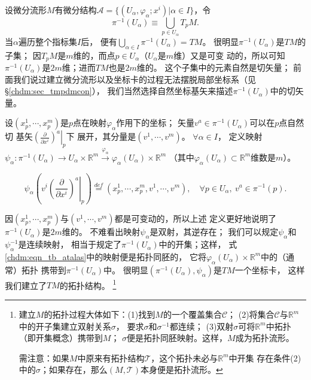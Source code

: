 设微分流形$M$有微分结构$\mathscr{A}=\{(U_\alpha,\varphi_\alpha;x^i)|\alpha \in I \}$，令
\begin{equation}
    \pi^{-1} (U_\alpha) \equiv \bigcup _{p\in U_\alpha} T_pM .
\end{equation}
当$\alpha$遍历整个指标集$I$后，
便有$\bigcup _{\alpha \in I}  \pi^{-1} (U_\alpha) = TM$。
很明显$\pi^{-1} (U_\alpha)$是$TM$的子集；
因$T_pM$是$m$维的，而点$p\in U_\alpha$（$U_\alpha$是$m$维）又是可变
动的，所以可知$\pi^{-1} (U_\alpha)$是$2m$维；进而$TM$也是$2m$维的。
这个子集中的元素自然是切矢量；
前面我们说过建立微分流形以及坐标卡的过程无法摆脱局部坐标系（见\S \ref{chdm:sec_tmpdmcon}），
我们当然选择自然坐标基矢来描述$\pi^{-1} (U_\alpha)$中的切矢量。


设$(x_p^1,\cdots,x_p^m)$是$p$点在映射$\varphi_\alpha$作用下的坐标；
矢量$v^a\in \pi^{-1} (U_\alpha)$可以在$p$点自然切
基矢$\left.\left(\frac{\partial }{\partial x^i}\right)^a \right | _p$下
展开，其分量是$(v^1,\cdots,v^m)$。
$\forall \alpha \in I$，
定义映射$\psi_\alpha: \pi^{-1} (U_\alpha) \to U_\alpha \times \mathbb{R}^m 
\overset{\varphi_\alpha}{\longrightarrow} \varphi_\alpha(U_\alpha) \times \mathbb{R}^m $
（其中$\varphi_\alpha(U_\alpha) \subset \mathbb{R}^m$维数是$m$）。
\begin{small}
\begin{equation}\label{chdm:eqn_tb_atalas}
    \psi_\alpha\left(v^i \left. \left(\frac{\partial }{\partial x^i}\right)^a 
    \right | _p \right) \overset{def}{=} \left(x_p^1,\cdots,x_p^m, v^1,\cdots,v^m\right),
    \quad \forall p\in U_\alpha,\ v^a\in \pi^{-1} (p).
\end{equation}
\end{small}
因$(x_p^1,\cdots,x_p^m)$与$(v^1,\cdots,v^m)$都是可变动的，所以上述
定义更好地说明了$\pi^{-1} (U_\alpha)$是$2m$维的。
不难看出映射$\psi_\alpha$是双射，其逆存在；
我们可以规定$\psi_\alpha$和$\psi_\alpha^{-1}$是连续映射，
相当于规定了$\pi^{-1} (U_\alpha)$中的开集；这样，
式\eqref{chdm:eqn_tb_atalas}中的映射便是拓扑同胚的，
它将$\varphi_\alpha(U_\alpha) \times \mathbb{R}^m $中的（通常）拓扑
携带到$\pi^{-1} (U_\alpha)$中。
很明显$(\pi^{-1} (U_\alpha),\psi_\alpha)$是$TM$一个坐标卡，
这样我们建立了$TM$的拓扑结构。
{\footnote{建立$M$的拓扑过程大体如下：(1)找到$M$的一个覆盖集合$\mathcal{C}$；
        (2)将集合$\mathcal{C}$与$\mathbb{R}^m$中的开子集建立双射关系$\sigma$，
        要求$\sigma$和$\sigma^{-1}$都连续；
        (3)双射$\sigma$可将$\mathbb{R}^m$中拓扑（即开集概念）携带到$M$；
        $\sigma$便是拓扑同胚映射。这样，$M$成为拓扑流形。
        
    需注意：如果$M$中原来有拓扑结构$\mathcal{T}$，这个拓扑未必与$\mathbb{R}^m$中开集
存在条件(2)中的$\sigma$；如果存在，那么$(M,\mathcal{T})$本身便是拓扑流形。}}



